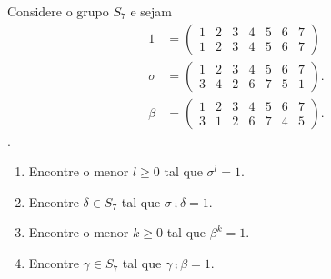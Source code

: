 \documentclass[12pt]{exam}
\begin{document}
    \questao{} Considere o grupo $S_7$ e sejam
    \begin{align*}
        1 &= \begin{pmatrix}
            1 & 2 & 3 & 4 & 5 & 6 & 7\\
            1 & 2 & 3 & 4 & 5 & 6 & 7
        \end{pmatrix}\\
        \sigma &= \begin{pmatrix}
            1 & 2 & 3 & 4 & 5 & 6 & 7\\
            3 & 4 & 2 & 6 & 7 & 5 & 1
        \end{pmatrix}.\\
        \beta &= \begin{pmatrix}
            1 & 2 & 3 & 4 & 5 & 6 & 7\\
            3 & 1 & 2 & 6 & 7 & 4 & 5
        \end{pmatrix}.
    \end{align*}.
    \begin{enumerate}[label=({\alph*})]
        \item Encontre o menor $l \ge 0$ tal que $\sigma^l = 1$.

        \item Encontre $\delta \in S_7$ tal que $\sigma\comp\delta = 1$.

        \item Encontre o menor $k \ge 0$ tal que $\beta^k = 1$.

        \item Encontre $\gamma \in S_7$ tal que $\gamma\comp\beta = 1$.
    \end{enumerate}

    \vspace{.3cm}

    \vspace{.3cm}
\end{document}
